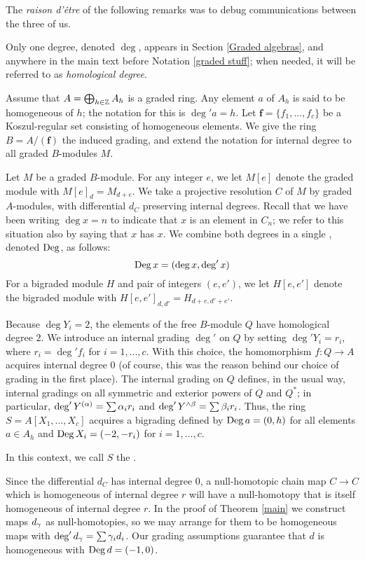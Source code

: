 The {\sl raison d'\^etre\/} of the following remarks was to debug
communications between the three of us.

\begin{Remark}
\label{bigrading}
Only one degree, denoted $\deg$, appears in Section \ref{Graded
algebras}, and anywhere in the main text before Notation \ref{graded
stuff}; when needed, it will be referred to as {\it homological
degree\/}.

Assume that $A=\bigoplus_{h\in{\mathbb Z}}A_h$ is a graded ring.  Any element
$a$ of $A_h$ is said to be homogeneous of {\it{}\/}
$h$; the notation for this is $\deg' a=h$.  Let ${\boldsymbol f}=\{f_1,
\dots, f_c\}$ be a Koszul-regular set consisting of homogeneous
elements.  We give the ring $B=A/({\boldsymbol f})$ the induced
grading, and extend the notation for internal degree to all graded
$B$-modules $M$.

Let $M$ be a graded $B$-module.  For any integer $e$, we let $M[e]$
denote the graded module with $M[e]_d = M_{d+e}$.  We take a projective
resolution $C$ of $M$ by graded $A$-modules, with differential $d_C$
preserving internal degrees.  Recall that we have been writing $\deg x
= n$ to indicate that $x$ is an element in $C_n$; we refer to this
situation also by saying that $x$ has {\it{}}
$x$.  We combine both degrees in a single {\it{}}, denoted
$\operatorname{Deg}$, as follows:
\[
\operatorname{Deg} x = (\deg x, \deg' x)
\]
For a bigraded module $H$ and pair of integers $(e, e')$, we let
$H[e,e']$ denote the bigraded module with $H[e,e']_{d,d'} =
H_{d+e,d'+e'}$.

Because $\deg Y_i = 2$, the elements of the free $B$-module $Q$ have
homological degree $2$.  We introduce an internal grading $\deg'$ on
$Q$ by setting $\deg' Y_i = r_i$, where $r_i=\deg' f_i$ for
$i=1,\dots,c$.  With this choice, the homomorphism $f\colon Q\to A$
acquires internal degree $0$ (of course, this was the reason behind our
choice of grading in the first place).  The internal grading on $Q$
defines, in the usual way, internal gradings on all symmetric and
exterior powers of $Q$ and $Q^*$; in particular, $\deg'Y^{(\alpha)}=\sum
\alpha_i r_i$ and $\deg' Y^{\wedge\beta} = \sum \beta_i r_i$.  Thus, the ring
$S=A[X_1,\dots,X_c]$ acquires a bigrading defined by
$\operatorname{Deg} a=(0, h)$ for all elements $a\in A_h$ and $\operatorname{Deg} X_i=(-2,-r_i)$
for $i=1,\dots,c$.

In this context, we call $S$ the {\it{}\/}.

Since the differential $d_C$ has internal degree $0$, a null-homotopic
chain map $C\to C$ which is homogeneous of internal degree $r$ will
have a null-homotopy that is itself homogeneous of internal degree
$r$.  In the proof of Theorem \ref{main} we construct maps $d_\gamma$ as
null-homotopies, so we may arrange for them to be homogeneous maps with
$\deg' d_\gamma = \sum \gamma_i d_i$.  Our grading assumptions guarantee that
$d$ is homogeneous with $\operatorname{Deg} d=(-1,0)$.


\end{Remark}
